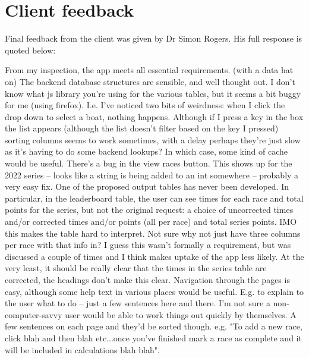 \documentclass{l4proj}
\begin{document}
\section{Client feedback}

Final feedback from the client was given by Dr Simon Rogers. His full response is quoted below:

\begin{displayquote}
    \begin{outline}
        \1 
        From my inspection, the app meets all essential requirements.
        \1
        (with a data hat on) The backend database structures are sensible, and well thought out.
        \1
        I don't know what js library you're using for the various tables, but it seems a bit buggy for me (using firefox). I.e. I've noticed two bits of weirdness:
            \2 
            when I click the drop down to select a boat, nothing happens. Although if I press a key in the box the list appears (although the list doesn't filter based on the key I pressed)
            \2
            sorting columns seems to work sometimes, with a delay
        perhaps they're just slow as it's having to do some backend lookups? In which case, some kind of cache would be useful.
        \1 
        There's a bug in the view races button. This shows up for the 2022 series -- looks like a string is being added to an int somewhere -- probably a very easy fix.
        \1 
        One of the proposed output tables has never been developed. In particular, in the leaderboard table, the user can see times for each race and total points for the series, but not the original request: a choice of uncorrected times and/or corrected times and/or points (all per race) and total series points. IMO this makes the table hard to interpret. Not sure why not just have three columns per race with that info in? I guess this wasn't formally a requirement, but was discussed a couple of times and I think makes uptake of the app less likely. At the very least, it should be really clear that the times in the series table are corrected, the headings don't make this clear.
        \1 
        Navigation through the pages is easy, although some help text in various places would be useful. E.g. to explain to the user what to do -- just a few sentences here and there. I'm not sure a non-computer-savvy user would be able to work things out quickly by themselves. A few sentences on each page and they'd be sorted though. e.g. "To add a new race, click blah and then blah etc...once you've finished mark a race as complete and it will be included in calculations blah blah".

\end{outline}
\end{displayquote}
\end{document}

